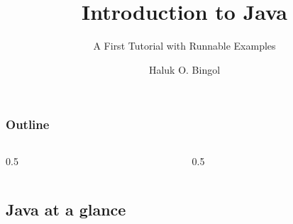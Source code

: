 \documentclass[aspectratio=169,10pt,compress]{beamer}
\title{Introduction to Java}
\subtitle{A First Tutorial with Runnable Examples}
\author[Bingol]{Haluk O. Bingol}
\institute[FCIS]{
    Faculty of Computer and Information Sciences\\
    Yeditepe University
}
\date{
	{\tiny \hbTimeStamp}
}
\begin{document}
\begin{frame}[t,fragile]
  \titlepage
\end{frame}




\begin{frame}[t,fragile] \frametitle{Outline}
  \begin{columns}[T]
    \begin{column}{0.5\textwidth}
      \tableofcontents[sections={1-5}, hideallsubsections]
    \end{column}
    \begin{column}{0.5\textwidth}
      \tableofcontents[sections={6-9}, hideallsubsections]
    \end{column}
  \end{columns}
\end{frame}


\subsection[Overview]{Java at a glance}
\end{document}
